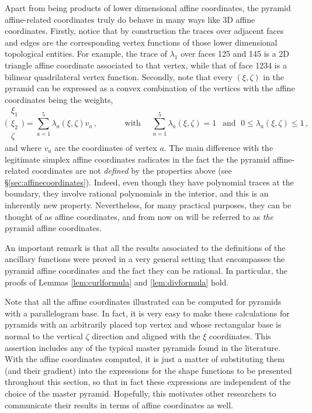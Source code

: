 Apart from being products of lower dimensional affine coordinates, the pyramid affine-related coordinates truly do behave in many ways like 3D affine coordinates.
Firstly, notice that by construction the traces over adjacent faces and edges are the corresponding vertex functions of those lower dimensional topological entities.
For example, the trace of $\lambda_1$ over faces 125 and 145 is a 2D triangle affine coordinate associated to that vertex, while that of face 1234 is a bilinear quadrilateral vertex function.
Secondly, note that every $(\xi,\zeta)$ in the pyramid can be expressed as a convex combination of the vertices with the affine coordinates being the weights,
\begin{equation}
	\bigg(\begin{smallmatrix}\xi_1\\[2pt]\xi_2\\[2pt]\zeta\end{smallmatrix}\bigg)=\sum_{a=1}^5 \lambda_a(\xi,\zeta)v_a\,,
		\qquad\quad\text{ with }\quad\sum_{a=1}^5 \lambda_a(\xi,\zeta)=1\,\;\text{ and }\; 0\leq\lambda_a(\xi,\zeta)\leq1\,,
\end{equation}
and where $v_a$ are the coordinates of vertex $a$. 
The main difference with the legitimate simplex affine coordinates radicates in the fact the the pyramid affine-related coordinates are not \textit{defined} by the properties above (see \S\ref{sec:affinecoordinates}).
Indeed, even though they have polynomial traces at the boundary, they involve rational polynomials in the interior, and this is an inherently new property.
Nevertheless, for many practical purposes, they can be thought of as affine coordinates, and from now on will be referred to as \textit{the} pyramid affine coordinates.

An important remark is that all the results associated to the definitions of the ancillary functions were proved in a very general setting that encompasses the pyramid affine coordinates and the fact they can be rational. 
In particular, the proofs of Lemmas \ref{lem:curlformula} and \ref{lem:divformula} hold.

Note that all the affine coordinates illustrated can be computed for pyramids with a parallelogram base.
In fact, it is very easy to make these calculations for pyramids with an arbitrarily placed top vertex and whose rectangular base is normal to the vertical $\zeta$ direction and aligned with the $\xi$ coordinates.
This assertion includes any of the typical master pyramids found in the literature.
With the affine coordinates computed, it is just a matter of substituting them (and their gradient) into the expressions for the shape functions to be presented throughout this section, so that in fact these expressions are independent of the choice of the master pyramid.
Hopefully, this motivates other researchers to communicate their results in terms of affine coordinates as well.

